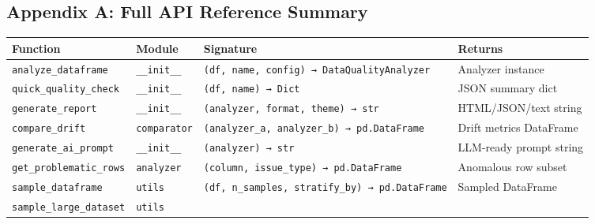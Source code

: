 \documentclass{article}
\newcounter{none} %
\begin{document}
\subsection{Appendix A: Full API Reference
Summary}\label{appendix-a-full-api-reference-summary}

{\def\LTcaptype{none} %
\begin{longtable}[]{@{}
  >{\raggedright\arraybackslash}p{}
  >{\raggedright\arraybackslash}p{}
  >{\raggedright\arraybackslash}p{}
  >{\raggedright\arraybackslash}p{}@{}}
\toprule\noalign{}
\begin{minipage}[b]{\linewidth}\raggedright
Function
\end{minipage} & \begin{minipage}[b]{\linewidth}\raggedright
Module
\end{minipage} & \begin{minipage}[b]{\linewidth}\raggedright
Signature
\end{minipage} & \begin{minipage}[b]{\linewidth}\raggedright
Returns
\end{minipage} \\
\midrule\noalign{}
\endhead
\bottomrule\noalign{}
\endlastfoot
\texttt{analyze\_dataframe} & \texttt{\_\_init\_\_} &
\texttt{(df,~name,~config)~→~DataQualityAnalyzer} & Analyzer instance \\
\texttt{quick\_quality\_check} & \texttt{\_\_init\_\_} &
\texttt{(df,~name)~→~Dict} & JSON summary dict \\
\texttt{generate\_report} & \texttt{\_\_init\_\_} &
\texttt{(analyzer,~format,~theme)~→~str} & HTML/JSON/text string \\
\texttt{compare\_drift} & \texttt{comparator} &
\texttt{(analyzer\_a,~analyzer\_b)~→~pd.DataFrame} & Drift metrics
DataFrame \\
\texttt{generate\_ai\_prompt} & \texttt{\_\_init\_\_} &
\texttt{(analyzer)~→~str} & LLM-ready prompt string \\
\texttt{get\_problematic\_rows} & \texttt{analyzer} &
\texttt{(column,~issue\_type)~→~pd.DataFrame} & Anomalous row subset \\
\texttt{sample\_dataframe} & \texttt{utils} &
\texttt{(df,~n\_samples,~stratify\_by)~→~pd.DataFrame} & Sampled
DataFrame \\
\texttt{sample\_large\_dataset} & \texttt{utils} &

\end{longtable}}
\end{document}
